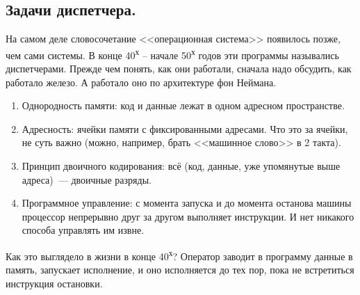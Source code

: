 \documentclass{article}
\begin{document}
    \subsection{Задачи диспетчера.}
    На самом деле словосочетание <<операционная система>> появилось позже, чем сами системы. В конце 40\textsuperscript{х} -- начале 50\textsuperscript{х} годов эти программы назывались диспетчерами.
    Прежде чем понять, как они работали, сначала надо обсудить, как работало железо. А работало оно по архитектуре фон Неймана.
    \begin{enumerate}
        \item Однородность памяти: код и данные лежат в одном адресном пространстве.
        \item Адресность: ячейки памяти с фиксированными адресами. Что это за ячейки, не суть важно (можно, например, брать <<машинное слово>> в 2 такта).
        \item Принцип двоичного кодирования: всё (код, данные, уже упомянутые выше адреса)~--- двоичные разряды.
        \item Программное управление: с момента запуска и до момента останова машины процессор непрерывно друг за другом выполняет инструкции. И нет никакого способа управлять им извне.
    \end{enumerate}
    \begin{figure}[H]
    \end{figure}

    Как это выглядело в жизни в конце 40\textsuperscript{х}? Оператор заводит в программу данные в память, запускает исполнение, и оно исполняется до тех пор, пока не встретиться инструкция остановки.
\end{document}
